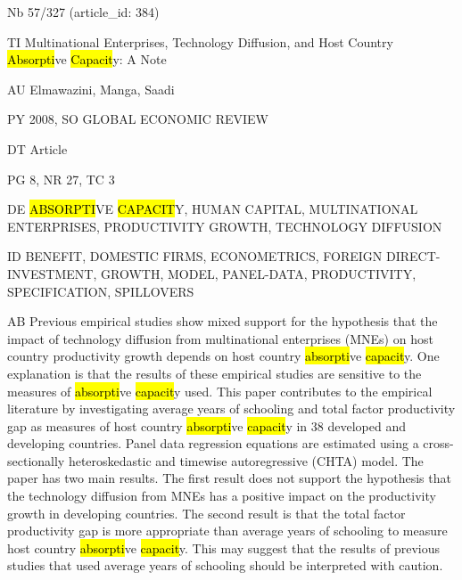\documentclass[a4paper]{article}
\begin{document}
\vspace*{-2cm}
Nb \tabto{0cm}57/327 (article\_id: 384)\par
TI \tabto{0cm}Multinational Enterprises, Technology Diffusion, and Host Country \hl{Absorpti}ve \hl{Capacit}y: A Note\par
AU \tabto{0cm}Elmawazini, Manga, Saadi\par
PY \tabto{0cm}2008, SO GLOBAL ECONOMIC REVIEW\par
DT \tabto{0cm}Article\par
PG \tabto{0cm}8, NR 27, TC 3\par
DE \tabto{0cm}\hl{ABSORPTI}VE \hl{CAPACIT}Y, HUMAN CAPITAL, MULTINATIONAL ENTERPRISES, PRODUCTIVITY GROWTH, TECHNOLOGY DIFFUSION\par
ID \tabto{0cm}BENEFIT, DOMESTIC FIRMS, ECONOMETRICS, FOREIGN DIRECT-INVESTMENT, GROWTH, MODEL, PANEL-DATA, PRODUCTIVITY, SPECIFICATION, SPILLOVERS\par
AB \tabto{0cm}Previous empirical studies show mixed support for the hypothesis that the impact of technology diffusion from multinational enterprises (MNEs) on host country productivity growth depends on host country \hl{absorpti}ve \hl{capacit}y. One explanation is that the results of these empirical studies are sensitive to the measures of \hl{absorpti}ve \hl{capacit}y used. This paper contributes to the empirical literature by investigating average years of schooling and total factor productivity gap as measures of host country \hl{absorpti}ve \hl{capacit}y in 38 developed and developing countries. Panel data regression equations are estimated using a cross-sectionally heteroskedastic and timewise autoregressive (CHTA) model. The paper has two main results. The first result does not support the hypothesis that the technology diffusion from MNEs has a positive impact on the productivity growth in developing countries. The second result is that the total factor productivity gap is more appropriate than average years of schooling to measure host country \hl{absorpti}ve \hl{capacit}y. This may suggest that the results of previous studies that used average years of schooling should be interpreted with caution.\par
\clearpage
\end{document}
